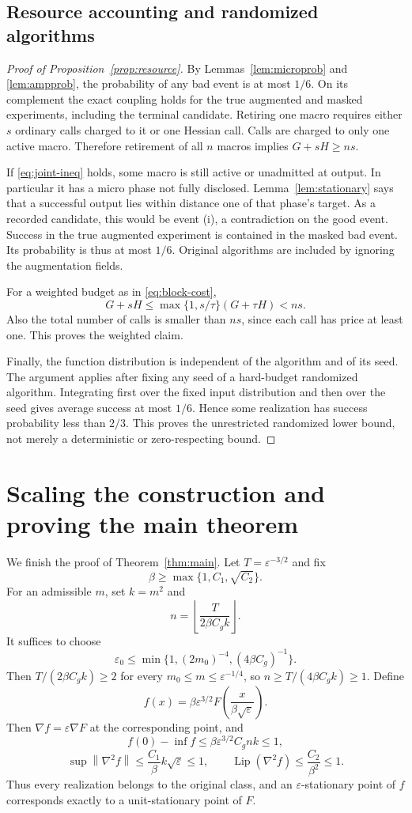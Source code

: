 \documentclass[11pt]{article}
\theoremstyle{definition}
\theoremstyle{remark}
\newcommand{\eps}{\varepsilon}
\newcommand{\norm}[1]{\left\|#1\right\|}
\newcommand{\Lip}{\operatorname{Lip}}
\begin{document}
\subsection{Resource accounting and randomized algorithms}
\begin{proof}[Proof of Proposition~\ref{prop:resource}]
By Lemmas~\ref{lem:microprob} and \ref{lem:ampprob}, the probability of any bad event is at most $1/6$. On its complement the exact coupling holds for the true augmented and masked experiments, including the terminal candidate. Retiring one macro requires either $s$ ordinary calls charged to it or one Hessian call. Calls are charged to only one active macro. Therefore retirement of all $n$ macros implies $G+sH\ge ns$.

If \eqref{eq:joint-ineq} holds, some macro is still active or unadmitted at output. In particular it has a micro phase not fully disclosed. Lemma~\ref{lem:stationary} says that a successful output lies within distance one of that phase's target. As a recorded candidate, this would be event (i), a contradiction on the good event. Success in the true augmented experiment is contained in the masked bad event. Its probability is thus at most $1/6$. Original algorithms are included by ignoring the augmentation fields.

For a weighted budget as in \eqref{eq:block-cost},
\[
 G+sH\le\max\{1,s/\tau\}(G+\tau H)<ns.
\]
Also the total number of calls is smaller than $ns$, since each call has price at least one. This proves the weighted claim.

Finally, the function distribution is independent of the algorithm and of its seed. The argument applies after fixing any seed of a hard-budget randomized algorithm. Integrating first over the fixed input distribution and then over the seed gives average success at most $1/6$. Hence some realization has success probability less than $2/3$. This proves the unrestricted randomized lower bound, not merely a deterministic or zero-respecting bound.
\end{proof}

\section{Scaling the construction and proving the main theorem}\label{sec:calibration}
We finish the proof of Theorem~\ref{thm:main}. Let $T=\eps^{-3/2}$ and fix
\[
 \beta\ge\max\{1,C_1,\sqrt{C_2}\}.
\]
For an admissible $m$, set $k=m^2$ and
\[
 n=\left\lfloor\frac{T}{2\beta C_g k}\right\rfloor.
\]
It suffices to choose
\[
 \eps_0\le\min\{1,(2m_0)^{-4},(4\beta C_g)^{-1}\}.
\]
Then $T/(2\beta C_gk)\ge2$ for every $m_0\le m\le\eps^{-1/4}$, so $n\ge T/(4\beta C_gk)\ge1$. Define
\begin{equation}\label{eq:scaling}
 f(x)=\beta\eps^{3/2}F\!\left(\frac{x}{\beta\sqrt\eps}\right).
\end{equation}
Then $\nabla f=\eps\nabla F$ at the corresponding point, and
\[
 f(0)-\inf f\le\beta\eps^{3/2}C_gnk\le1,
\]
\[
 \sup\norm{\nabla^2f}\le\frac{C_1}{\beta}k\sqrt\eps\le1,
 \qquad
 \Lip(\nabla^2f)\le\frac{C_2}{\beta^2}\le1.
\]
Thus every realization belongs to the original class, and an $\eps$-stationary point of $f$ corresponds exactly to a unit-stationary point of $F$.
\end{document}
